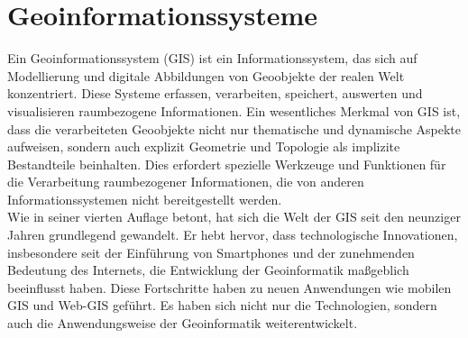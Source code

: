 \section{Geoinformationssysteme}
Ein Geoinformationssystem (GIS) ist ein Informationssystem, das sich auf Modellierung und digitale Abbildungen von Geoobjekte der realen Welt konzentriert. Diese Systeme erfassen, verarbeiten, speichert, auswerten und visualisieren raumbezogene Informationen. Ein wesentliches Merkmal von GIS ist, dass die verarbeiteten Geoobjekte nicht nur thematische und dynamische Aspekte aufweisen, sondern auch explizit Geometrie und Topologie als implizite Bestandteile beinhalten. Dies erfordert spezielle Werkzeuge und Funktionen für die Verarbeitung raumbezogener Informationen, die von anderen Informationssystemen nicht bereitgestellt werden. \cite[S.~373]{de_lange_geoinformatik_2020} \\
Wie \cite{de_lange_geoinformatik_2020} in seiner vierten Auflage betont, hat sich die Welt der GIS seit den neunziger Jahren grundlegend gewandelt. Er hebt hervor, dass technologische Innovationen, insbesondere seit der Einführung von Smartphones und der zunehmenden Bedeutung des Internets, die Entwicklung der Geoinformatik maßgeblich beeinflusst haben. Diese Fortschritte haben zu neuen Anwendungen wie mobilen GIS und Web-GIS geführt. Es haben sich nicht nur die Technologien, sondern auch die Anwendungsweise der Geoinformatik weiterentwickelt. 